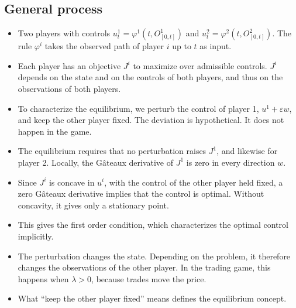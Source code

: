\documentclass[11pt]{article}
\begin{document}
\subsection*{General process}
\begin{itemize}[leftmargin=*]
  \item Two players with controls $u^1_t = \varphi^1(t, O^1_{[0,t]})$ and $u^2_t = \varphi^2(t, O^2_{[0,t]})$. The rule $\varphi^i$ takes the observed path of player $i$ up to $t$ as input.
  \item Each player has an objective $J^i$ to maximize over admissible controls. $J^i$ depends on the state and on the controls of both players, and thus on the observations of both players.
  \item To characterize the equilibrium, we perturb the control of player 1, $u^1 + \varepsilon w$, and keep the other player fixed. The deviation is hypothetical. It does not happen in the game.
  \item The equilibrium requires that no perturbation raises $J^1$, and likewise for player 2. Locally, the G\^ateaux derivative of $J^1$ is zero in every direction $w$.
  \item Since $J^i$ is concave in $u^i$, with the control of the other player held fixed, a zero G\^ateaux derivative implies that the control is optimal. Without concavity, it gives only a stationary point.
  \item This gives the first order condition, which characterizes the optimal control implicitly.
  \item The perturbation changes the state. Depending on the problem, it therefore changes the observations of the other player. In the trading game, this happens when $\lambda > 0$, because trades move the price.
  \item What ``keep the other player fixed'' means defines the equilibrium concept.
\end{itemize}
\end{document}
